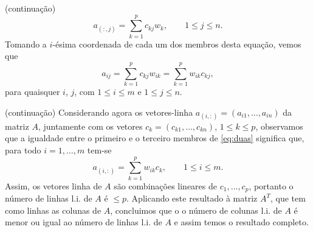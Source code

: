 \documentclass{beamer}
\begin{document}
\begin{darkframes}
\begin{frame}{}
  \alert{(continuação)}
  \begin{equation*}
    a_{(:,j)} = \sum_{k=1}^p c_{kj}w_k, \qquad 1\leq j \leq n.
  \end{equation*}
  Tomando a $i$-ésima coordenada de cada um dos membros desta equação, vemos que
  \begin{equation}\label{eq:duas}
    a_{ij} = \sum_{k=1}^p c_{kj}w_{ik}=\sum_{k=1}^p w_{ik}c_{kj},
  \end{equation}
  para quaisquer $i$, $j$, com $1\leq i \leq m$ e $1\leq j \leq n$.
\end{frame}

\begin{frame}
  \alert{(continuação)}
  Considerando agora os vetores-linha $a_{(i,:)}=(a_{i1},\ldots,a_{in})$ da matriz $A$, juntamente com os vetores $c_k=(c_{k1},\ldots,c_{kn})$, $1\leq k\leq p$, observamos que a igualdade entre o primeiro e o terceiro membros de \eqref{eq:duas} significa que, para todo $i=1,\ldots,m$ tem-se 
  \begin{equation*}
    a_{(i,:)} = \sum_{k=1}^p w_{ik} c_k, \qquad 1\leq i \leq m.
  \end{equation*}
  Assim, os vetores linha de $A$ são combinações lineares de $c_1,\ldots,c_p$, portanto o número de linhas l.i. de $A$ é $\leq p$. Aplicando este resultado à matriz $A^T$, que tem como linhas as colunas de $A$, concluimos que o o número de colunas l.i. de $A$ é menor ou igual ao número de linhas l.i. de $A$ e assim temos o resultado completo.
\end{frame}




\end{darkframes}
\end{document}
